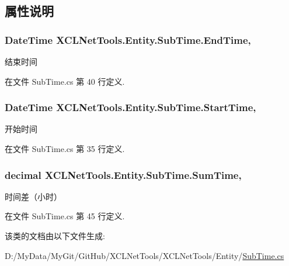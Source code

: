 \subsection{属性说明}
\hypertarget{class_x_c_l_net_tools_1_1_entity_1_1_sub_time_a286d907d4beb9e6153f1abdb6f2c95fd}{
\subsubsection[{End\-Time}]{\setlength{\rightskip}{0pt plus 5cm}Date\-Time X\-C\-L\-Net\-Tools.\-Entity.\-Sub\-Time.\-End\-Time\hspace{0.3cm}{\ttfamily [get]}, {\ttfamily [set]}}}\label{class_x_c_l_net_tools_1_1_entity_1_1_sub_time_a286d907d4beb9e6153f1abdb6f2c95fd}


结束时间 



在文件 Sub\-Time.\-cs 第 40 行定义.

\hypertarget{class_x_c_l_net_tools_1_1_entity_1_1_sub_time_a7813c7a0874535abbe0b5307d7310c27}{
\subsubsection[{Start\-Time}]{\setlength{\rightskip}{0pt plus 5cm}Date\-Time X\-C\-L\-Net\-Tools.\-Entity.\-Sub\-Time.\-Start\-Time\hspace{0.3cm}{\ttfamily [get]}, {\ttfamily [set]}}}\label{class_x_c_l_net_tools_1_1_entity_1_1_sub_time_a7813c7a0874535abbe0b5307d7310c27}


开始时间 



在文件 Sub\-Time.\-cs 第 35 行定义.

\hypertarget{class_x_c_l_net_tools_1_1_entity_1_1_sub_time_afe5aa74e0038c4b4342be84211c3f607}{
\subsubsection[{Sum\-Time}]{\setlength{\rightskip}{0pt plus 5cm}decimal X\-C\-L\-Net\-Tools.\-Entity.\-Sub\-Time.\-Sum\-Time\hspace{0.3cm}{\ttfamily [get]}, {\ttfamily [set]}}}\label{class_x_c_l_net_tools_1_1_entity_1_1_sub_time_afe5aa74e0038c4b4342be84211c3f607}


时间差（小时） 



在文件 Sub\-Time.\-cs 第 45 行定义.



该类的文档由以下文件生成\-:\begin{DoxyCompactItemize}
\item 
D\-:/\-My\-Data/\-My\-Git/\-Git\-Hub/\-X\-C\-L\-Net\-Tools/\-X\-C\-L\-Net\-Tools/\-Entity/\hyperlink{_sub_time_8cs}{Sub\-Time.\-cs}\end{DoxyCompactItemize}
